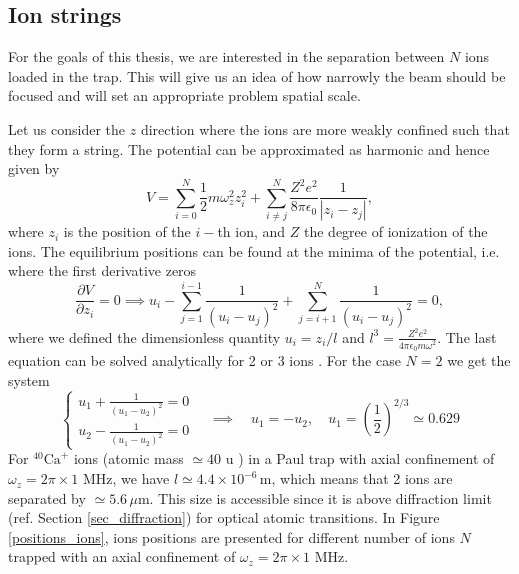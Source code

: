 \subsection{Ion strings}
\label{ionstrings}
For the goals of this thesis, we are interested in the separation between $N$ ions loaded in the trap. This will give us an idea of how narrowly the beam should be focused and will set an appropriate problem spatial scale.\par
Let us consider the $z$ direction where the ions are more weakly confined such that they form a string. The potential can be approximated as harmonic and hence given by
\begin{equation}
V = \sum_{i=0}^N \frac{1}{2}m\omega_z^2z_i^2 + \sum_{i\neq j}^N\frac{Z^2e^2}{8\pi \epsilon_0}\frac{1}{|z_i-z_j|},
\end{equation}
where $z_i$ is the position of the $i-$th ion, and $Z$ the degree of ionization of the ions. The equilibrium positions can be found at the minima of the potential, i.e. where the first derivative zeros
\begin{equation}
\frac{\partial V}{\partial z_i} = 0 \implies u_i - \sum_{j=1}^{i-1} \frac{1}{(u_i-u_j)^2} + \sum_{j= i+1}^{N} \frac{1}{(u_i-u_j)^2}= 0,
\end{equation}
where we defined the dimensionless quantity $u_i = z_i/l$ and $l^3 = \displaystyle\frac{Z^2 e^2 }{4\pi \epsilon_0 m\omega^2}$.
The last equation can be solved analytically for 2 or 3 ions \cite{ion_spacing}. For the case $N=2$ we get the system
\begin{equation}
\begin{cases}
  u_1 + \frac{1}{(u_1-u_2)^2} = 0\\
  u_2 - \frac{1}{(u_1-u_2)^2} = 0
  \end{cases} \quad \implies \quad u_1 = -u_2,\quad  u_1 = \left(\frac{1}{2}\right)^{2/3} \simeq 0.629
\end{equation}
For $^{40}\text{Ca}^+$ ions (atomic mass $\simeq 40$ u \cite{AUDI2003337}) in a Paul trap with axial confinement of $\omega_z = 2\pi \times 1$ MHz, we have $l \simeq 4.4\times 10^{-6}\,$m, which means that 2 ions are separated by $\simeq 5.6\, \mu$m. This size is accessible since it is above diffraction limit (ref. Section \ref{sec_diffraction}) for optical atomic transitions.
In Figure \ref{positions_ions}, ions positions are presented for different number of ions $N$ trapped with an axial confinement of $\omega_z = 2\pi \times 1$ MHz.

